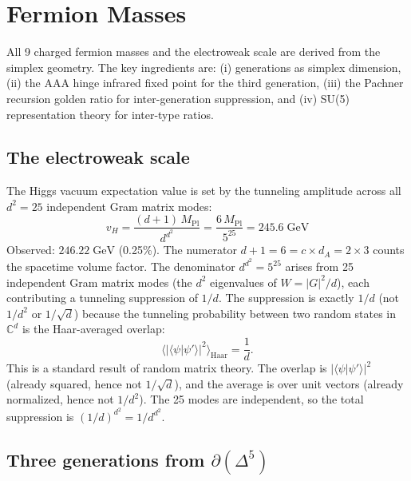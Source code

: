 \documentclass[12pt]{article}
\theoremstyle{remark}
\theoremstyle{definition}
\begin{document}

\section{Fermion Masses}
\label{ch:masses}

All 9 charged fermion masses and the electroweak scale are derived from the simplex geometry. The key ingredients are: (i) generations as simplex dimension, (ii) the AAA hinge infrared fixed point for the third generation, (iii) the Pachner recursion golden ratio for inter-generation suppression, and (iv) SU(5) representation theory for inter-type ratios.

\subsection{The electroweak scale}

The Higgs vacuum expectation value is set by the tunneling amplitude across all $d^2 = 25$ independent Gram matrix modes:
\begin{equation}
\boxed{v_H = \frac{(d+1)\,M_\text{Pl}}{d^{d^2}} = \frac{6\,M_\text{Pl}}{5^{25}} = 245.6\;\text{GeV}}
\end{equation}
Observed: $246.22\;\text{GeV}$ (0.25\%). The numerator $d + 1 = 6 = c \times d_A = 2 \times 3$ counts the spacetime volume factor. The denominator $d^{d^2} = 5^{25}$ arises from 25 independent Gram matrix modes (the $d^2$ eigenvalues of $W = |G|^2/d$), each contributing a tunneling suppression of $1/d$. The suppression is exactly $1/d$ (not $1/d^2$ or $1/\sqrt{d}$) because the tunneling probability between two random states in $\mathbb{C}^d$ is the Haar-averaged overlap:
\begin{equation}
\langle|\langle\psi|\psi'\rangle|^2\rangle_\text{Haar} = \frac{1}{d}.
\end{equation}
This is a standard result of random matrix theory. The overlap is $|\langle\psi|\psi'\rangle|^2$ (already squared, hence not $1/\sqrt{d}$), and the average is over unit vectors (already normalized, hence not $1/d^2$). The 25 modes are independent, so the total suppression is $(1/d)^{d^2} = 1/d^{d^2}$.

\subsection{Three generations from $\partial(\Delta^5)$}
\label{sec:three_gen}
\end{document}
